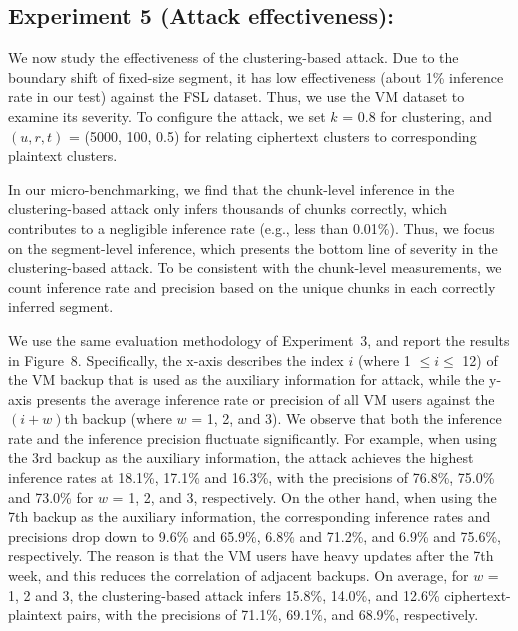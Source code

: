 \subsection{Experiment 5 (Attack effectiveness):} We now study the
effectiveness of the clustering-based attack. Due to the boundary shift of
fixed-size segment, it has low effectiveness
(about 1\% inference rate in our test) against the FSL dataset.  Thus, we use
the VM dataset to examine its severity. To configure the attack, we set $k$ =
0.8 for clustering, and $(u, r, t)$ = (5000, 100, 0.5) for relating ciphertext
clusters to corresponding plaintext clusters.  

In our micro-benchmarking, we find that the chunk-level inference in the
clustering-based attack only infers thousands of chunks correctly, which
contributes to a negligible inference rate (e.g., less than 0.01\%).  
Thus, we focus on the
segment-level inference, which presents the bottom line of severity in the
clustering-based attack. To be consistent with the chunk-level measurements, we count inference rate and precision based
on the unique chunks in each correctly inferred segment. 

We use the same evaluation methodology of Experiment~3, and report the results
in Figure~8. Specifically, the x-axis describes the index $i$ (where 1 $\leq i \leq$
12) of the VM backup that is used as the auxiliary information for attack,
while the y-axis presents the average inference rate or precision of all VM
users against the $(i+w)$th backup (where $w$ = 1, 2, and 3). We observe that both the inference rate and the inference
precision fluctuate significantly. For example, when using the 3rd backup as
the auxiliary information, the attack achieves the highest inference rates at
18.1\%, 17.1\% and 16.3\%, with the precisions of 76.8\%, 75.0\% and 73.0\%
for $w$ = 1, 2, and 3, respectively. 
On the other hand, when using the 7th
backup as the auxiliary information, the corresponding inference rates and
precisions drop down to 9.6\% and 65.9\%, 6.8\% and 71.2\%, and 6.9\% and
75.6\%, respectively. The reason is that the VM users have heavy updates after
the 7th week, and this reduces the correlation  of adjacent backups. 
On
average, for $w$ = 1, 2 and 3, the clustering-based attack infers 15.8\%,
14.0\%, and 12.6\% ciphertext-plaintext pairs, with the precisions of 71.1\%,
69.1\%, and 68.9\%, respectively. 

